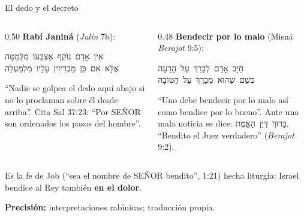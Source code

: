 \documentclass[hyperref={bookmarks=false},aspectratio=169]{beamer}
\newcommand{\heb}[1]{\mbox{\foreignlanguage{hebrew}{#1}}}
\newcommand{\SENOR}{S{\fontsize{0.78em}{1em}\selectfont EÑOR}}
\newcommand{\destacar}[1]{\textbf{\textcolor{azul}{#1}}}
\newcommand{\precision}[1]{{\footnotesize\color{gris}\textbf{Precisión:} #1}}
\begin{document}
\begin{frame}{El dedo y el decreto}
\begin{columns}[t,onlytextwidth]
\begin{column}{0.50\textwidth}\small
\textbf{Rabí Janiná} (\emph{Julín} 7b):
\begin{center}\heb{אֵין אָדָם נוֹקֵף אֶצְבָּעוֹ מִלְּמַטָּה}\\ \heb{אֶלָּא אִם כֵּן מַכְרִיזִין עָלָיו מִלְמַעְלָה}\end{center}
``Nadie se golpea el dedo aquí abajo si no lo proclaman sobre él desde arriba''. Cita Sal 37:23: ``Por \SENOR{} son ordenados los pasos del hombre''.
\end{column}
\begin{column}{0.48\textwidth}\small
\textbf{Bendecir por lo malo} (Misná \emph{Berajot} 9:5):
\begin{center}\heb{חַיָּב אָדָם לְבָרֵךְ עַל הָרָעָה}\\ \heb{כְּשֵׁם שֶׁהוּא מְבָרֵךְ עַל הַטּוֹבָה}\end{center}
``Uno debe bendecir por lo malo así como bendice por lo bueno''. Ante una mala noticia se dice: \heb{בָּרוּךְ דַּיַּן הָאֱמֶת}, ``Bendito el Juez verdadero'' (\emph{Berajot} 9:2).
\end{column}
\end{columns}\par\smallskip
\begin{tcolorbox}[colback=papiro,colframe=dorado,boxrule=1.2pt,arc=3pt]
\small Es la fe de Job (``sea el nombre de \SENOR{} bendito'', 1:21) hecha liturgia: Israel bendice al Rey también \destacar{en el dolor}.
\end{tcolorbox}
\precision{interpretaciones rabínicas; traducción propia.}
\end{frame}
\end{document}
